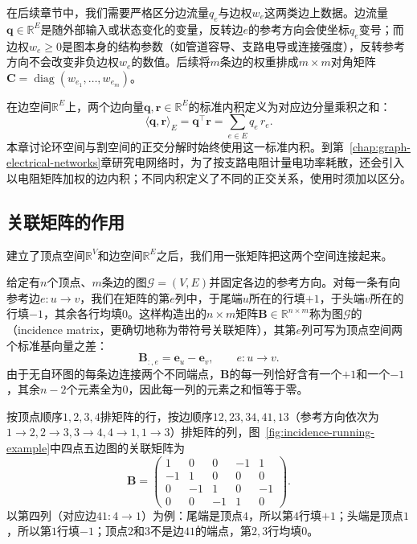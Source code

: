 在后续章节中，我们需要严格区分边流量$q_e$与边权$w_e$这两类边上数据。边流量$\bm{q}\in\mathbb{R}^E$是随外部输入或状态变化的变量，反转边$e$的参考方向会使坐标$q_e$变号；而边权$w_e\geq 0$是图本身的结构参数（如管道容导、支路电导或连接强度），反转参考方向不会改变非负边权$w_e$的数值。后续将$m$条边的权重排成$m\times m$对角矩阵$\bm{C}=\operatorname{diag}(w_{e_1},\ldots,w_{e_m})$。

在边空间$\mathbb{R}^E$上，两个边向量$\bm{q},\bm{r}\in\mathbb{R}^E$的标准内积定义为对应边分量乘积之和：
\begin{equation}
\langle\bm{q},\bm{r}\rangle_E=\bm{q}^\top\bm{r}=\sum_{e\in E}q_e\,r_e.
\label{eq:incidence-edge-inner-product}
\end{equation}
本章讨论环空间与割空间的正交分解时始终使用这一标准内积。到第~\ref{chap:graph-electrical-networks}章研究电网络时，为了按支路电阻计量电功率耗散，还会引入以电阻矩阵加权的边内积；不同内积定义了不同的正交关系，使用时须加以区分。

\subsection{关联矩阵的作用}
\label{sec:incidence-matrix-actions}

建立了顶点空间$\mathbb{R}^V$和边空间$\mathbb{R}^E$之后，我们用一张矩阵把这两个空间连接起来。

给定有$n$个顶点、$m$条边的图$\mathcal{G}=(V,E)$并固定各边的参考方向。对每一条有向参考边$e\colon u\to v$，我们在矩阵的第$e$列中，于尾端$u$所在的行填$+1$，于头端$v$所在的行填$-1$，其余各行均填$0$。这样构造出的$n\times m$矩阵$\bm{B}\in\mathbb{R}^{n\times m}$称为图$\mathcal{G}$的（incidence matrix，更确切地称为带符号关联矩阵），其第$e$列可写为顶点空间两个标准基向量之差：
\begin{equation}
\bm{B}_{:,e}=\bm{e}_u-\bm{e}_v,\qquad e\colon u\to v.
\label{eq:incidence-oriented-column}
\end{equation}
由于无自环图的每条边连接两个不同端点，$\bm{B}$的每一列恰好含有一个$+1$和一个$-1$，其余$n-2$个元素全为$0$，因此每一列的元素之和恒等于零。

按顶点顺序$1,2,3,4$排矩阵的行，按边顺序$12,23,34,41,13$（参考方向依次为$1\to2,2\to3,3\to4,4\to1,1\to3$）排矩阵的列，图~\ref{fig:incidence-running-example}中四点五边图的关联矩阵为
\[
\bm{B}=
\begin{pmatrix}
 1 & 0 & 0 & -1 & 1\\
 -1 & 1 & 0 & 0 & 0\\
 0 & -1 & 1 & 0 & -1\\
 0 & 0 & -1 & 1 & 0
\end{pmatrix}.
\]
以第四列（对应边$41\colon 4\to1$）为例：尾端是顶点$4$，所以第$4$行填$+1$；头端是顶点$1$，所以第$1$行填$-1$；顶点$2$和$3$不是边$41$的端点，第$2,3$行均填$0$。

